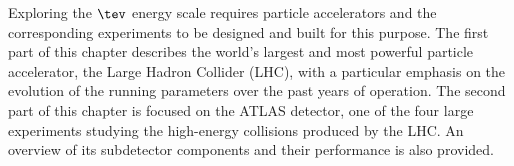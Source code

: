 \label{chp:det:intro}
Exploring the $\tev$ energy scale requires particle accelerators and the corresponding experiments to be designed and built for this purpose. The first part of this chapter describes the world's largest and most powerful particle accelerator, the Large Hadron Collider (LHC), with a particular emphasis on the evolution of the running parameters over the past years of operation. The second part of this chapter is focused on the ATLAS detector, one of the four large experiments studying the high-energy collisions produced by the LHC. An overview of its subdetector components and their performance is also provided.\\
 